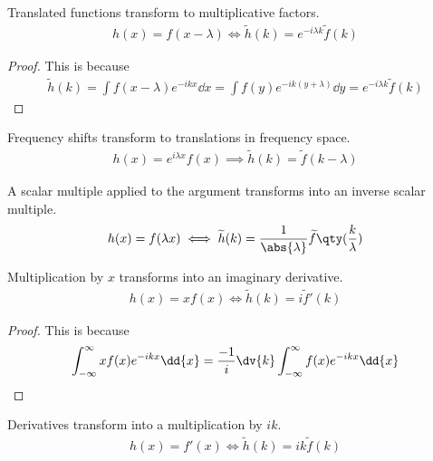 \begin{proposition}[Translation]
	Translated functions transform to multiplicative factors.
	\begin{align} \label{eq:8.9}
		h(x) = f(x - \lambda) \iff \widetilde h(k) = e^{-i\lambda k} \widetilde f(k)
	\end{align}
\end{proposition} 

\begin{proof}
	This is because
	\begin{align*}
		\widetilde h(k) = \int f(x - \lambda) e^{-ikx} \dd{x} = \int f(y) e^{-ik(y + \lambda)} \dd{y} = e^{-i\lambda k} \widetilde f(k)
	\end{align*}
\end{proof} 

\begin{proposition}
	Frequency shifts transform to translations in frequency space.
	\begin{align} \label{eq:8.10}
		h(x) = e^{i\lambda x}f(x) \implies \widetilde h(k) = \widetilde f(k - \lambda)
	\end{align}
\end{proposition} 

\begin{proposition}[Scaling]
	A scalar multiple applied to the argument transforms into an inverse scalar multiple.
	\begin{align} \label{eq:8.11}
		h(x) = f(\lambda x) \iff \widetilde h(k) = \frac{1}{\abs{\lambda}} \widetilde f\qty(\frac{k}{\lambda})
	\end{align}
\end{proposition} 

\begin{proposition}[Multiplication by $x$]
	Multiplication by $x$ transforms into an imaginary derivative.
	\begin{align} \label{eq:8.12}
		h(x) = xf(x) \iff \widetilde h(k) = i\widetilde f'(k)
	\end{align}
\end{proposition} 

\begin{proof}
	This is because
	\begin{align*}
		\int_{-\infty}^\infty xf(x) e^{-ikx} \dd{x} = \frac{-1}{i} \dv{k} \int_{-\infty}^\infty f(x) e^{-ikx} \dd{x}
	\end{align*}
\end{proof} 

\begin{proposition}[Derivatives]
	Derivatives transform into a multiplication by $ik$.
	\begin{align} \label{eq:8.13}
		h(x) = f'(x) \iff \widetilde h(k) = ik \widetilde f(k)
	\end{align}
\end{proposition} 

